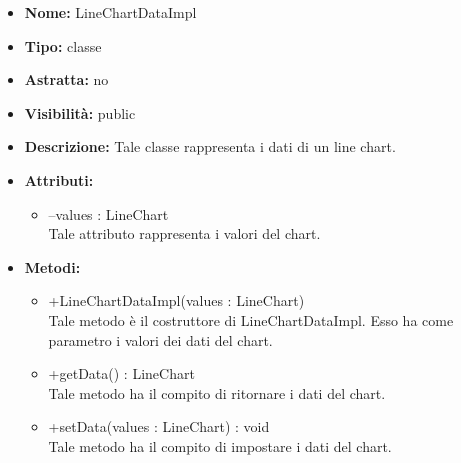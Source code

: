 	
			
			\begin{itemize}
			\item \textbf{Nome:} LineChartDataImpl
			\item \textbf{Tipo:} classe
			
		\item \textbf{Astratta:}
		no
			\item \textbf{Visibilità:} public
			\item \textbf{Descrizione:} Tale classe rappresenta i dati di un line chart.
			\item \textbf{Attributi:}
				\begin{itemize}
				\setlength{\itemsep}{5pt}
				
					\item[\ding{111}] {--values : LineChart} \\ [1mm] Tale attributo rappresenta i valori del chart.
				\end{itemize}
		
			\item \textbf{Metodi:}
				\begin{itemize}
				\setlength{\itemsep}{5pt}
				
					\item[\ding{111}] {{+LineChartDataImpl(values : LineChart)}} \\ [1mm] Tale metodo è il costruttore di LineChartDataImpl. Esso ha come parametro i valori dei dati del chart.
					\item[\ding{111}] {{+getData() : LineChart}} \\ [1mm] Tale metodo ha il compito di ritornare i dati del chart.
					\item[\ding{111}] {{+setData(values : LineChart) : void}} \\ [1mm] Tale metodo ha il compito di impostare i dati del chart.
				\end{itemize}
		
			\end{itemize}
	
